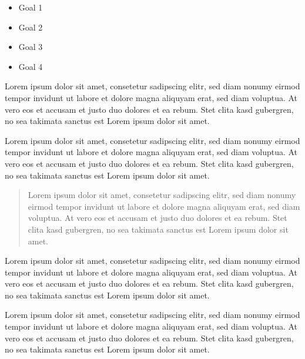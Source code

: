 \morning

\begin{goals}
  \begin{itemize}
    \item Goal 1
    \item Goal 2
    \item Goal 3
    \item Goal 4
  \end{itemize}
\end{goals}


\begin{wrong}
  Lorem ipsum dolor sit amet, consetetur sadipscing elitr, sed diam nonumy
  eirmod tempor invidunt ut labore et dolore magna aliquyam erat, sed diam
  voluptua. At vero eos et accusam et justo duo dolores et ea rebum. Stet clita
  kasd gubergren, no sea takimata sanctus est Lorem ipsum dolor sit amet.
\end{wrong}

\begin{correct}
  Lorem ipsum dolor sit amet, consetetur sadipscing elitr, sed diam nonumy
  eirmod tempor invidunt ut labore et dolore magna aliquyam erat, sed diam
  voluptua. At vero eos et accusam et justo duo dolores et ea rebum. Stet clita
  kasd gubergren, no sea takimata sanctus est Lorem ipsum dolor sit amet.
\end{correct}


\begin{quote}
  Lorem ipsum dolor sit amet, consetetur sadipscing elitr, sed diam nonumy
  eirmod tempor invidunt ut labore et dolore magna aliquyam erat, sed diam
  voluptua. At vero eos et accusam et justo duo dolores et ea rebum. Stet clita
  kasd gubergren, no sea takimata sanctus est Lorem ipsum dolor sit amet.
\end{quote}

\begin{question}
  Lorem ipsum dolor sit amet, consetetur sadipscing elitr, sed diam nonumy
  eirmod tempor invidunt ut labore et dolore magna aliquyam erat, sed diam
  voluptua. At vero eos et accusam et justo duo dolores et ea rebum. Stet clita
  kasd gubergren, no sea takimata sanctus est Lorem ipsum dolor sit amet.
\end{question}


\begin{confusion}
  Lorem ipsum dolor sit amet, consetetur sadipscing elitr, sed diam nonumy
  eirmod tempor invidunt ut labore et dolore magna aliquyam erat, sed diam
  voluptua. At vero eos et accusam et justo duo dolores et ea rebum. Stet clita
  kasd gubergren, no sea takimata sanctus est Lorem ipsum dolor sit amet.
\end{confusion}

